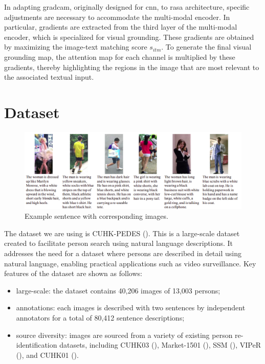 In adapting \acrshort{gradcam}, originally designed for \acrshort{cnn}, to \acrshort{rasa} architecture, specific adjustments are necessary to accommodate the multi-modal encoder. In particular, gradients are extracted from the third layer of the multi-modal encoder, which is specialized for visual grounding. These gradients are obtained by maximizing the image-text matching score $s_{itm}$. To generate the final visual grounding map, the attention map for each channel is multiplied by these gradients, thereby highlighting the regions in the image that are most relevant to the associated textual input.

\section{Dataset}

\begin{figure}[htbp]
  \begin{center}
      \includegraphics[width=\linewidth]{img/cuhk_pedes.png}
      \caption{Example sentence with corresponding images.}
      \label{fig:cuhk_pedes}
  \end{center}
\end{figure}


The dataset we are using is CUHK-PEDES (\cite{li2017personsearchnaturallanguage}). This is a large-scale dataset created to facilitate person search using natural language descriptions. It addresses the need for a dataset where persons are described in detail using natural language, enabling practical applications such as video surveillance. Key features of the dataset are shown as follows:
\begin{itemize}
  \item large-scale: the dataset contains 40,206 images of 13,003 persons; 
  \item annotations: each images is described with two sentences by independent annotators for a total of 80,412 sentence descriptions;
  \item source diversity: images are sourced from a variety of existing person re-identification datasets, including CUHK03 (\cite{li2014deepreid}), Market-1501 (\cite{7410490}), SSM (\cite{ssm}), VIPeR (\cite{viper}), and CUHK01 (\cite{li2012human}).
\end{itemize}

